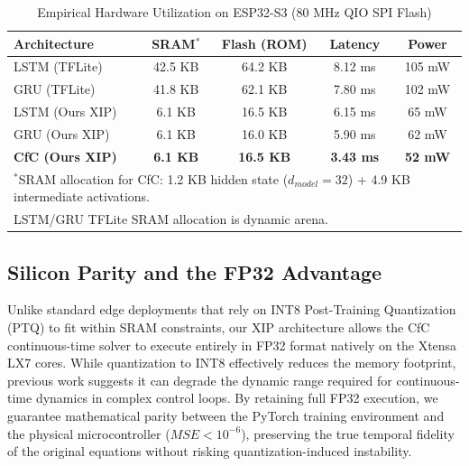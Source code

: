 \documentclass[conference]{IEEEtran}
\begin{document}
\begin{table}[h]
\centering
\caption{Empirical Hardware Utilization on ESP32-S3 (80 MHz QIO SPI Flash)}
\label{tab:hardware}
\begin{tabular}{|l|c|c|c|c|}
\hline
\textbf{Architecture} & \textbf{SRAM$^*$} & \textbf{Flash (ROM)} & \textbf{Latency} & \textbf{Power} \\ \hline
LSTM (TFLite) & 42.5 KB       & 64.2 KB              & 8.12 ms          & 105 mW         \\ \hline
GRU (TFLite)  & 41.8 KB       & 62.1 KB              & 7.80 ms          & 102 mW         \\ \hline
LSTM (Ours XIP) & 6.1 KB       & 16.5 KB              & 6.15 ms          & 65 mW          \\ \hline
GRU (Ours XIP)  & 6.1 KB       & 16.0 KB              & 5.90 ms          & 62 mW          \\ \hline
\textbf{CfC (Ours XIP)} & \textbf{6.1 KB} & \textbf{16.5 KB} & \textbf{3.43 ms} & \textbf{52 mW} \\ \hline
\multicolumn{5}{l}{\footnotesize $^*$SRAM allocation for CfC: 1.2 KB hidden state ($d_{model}=32$) + 4.9 KB intermediate activations.} \\
\multicolumn{5}{l}{\footnotesize LSTM/GRU TFLite SRAM allocation is dynamic arena.} \\
\end{tabular}
\end{table}

\subsection{Silicon Parity and the FP32 Advantage}
Unlike standard edge deployments that rely on INT8 Post-Training Quantization (PTQ) to fit within SRAM constraints, our XIP architecture allows the CfC continuous-time solver to execute entirely in FP32 format natively on the Xtensa LX7 cores. While quantization to INT8 effectively reduces the memory footprint, previous work suggests it can degrade the dynamic range required for continuous-time dynamics in complex control loops. By retaining full FP32 execution, we guarantee mathematical parity between the PyTorch training environment and the physical microcontroller ($MSE < 10^{-6}$), preserving the true temporal fidelity of the original equations without risking quantization-induced instability.
\end{document}

